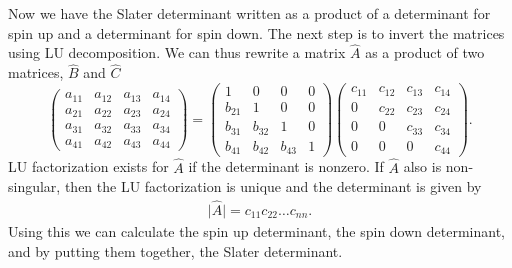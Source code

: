 		Now we have the Slater determinant written as a product of a determinant
		for spin up and a determinant for spin down. The next step is to invert
		the matrices using LU decomposition. We can thus rewrite a matrix
		$\hat{A}$ as a product of two matrices, $\hat{B}$ and $\hat{C}$
		\[
		\left(\begin{array}{cccc}
		a_{11} & a_{12} & a_{13} & a_{14}\\
		a_{21} & a_{22} & a_{23} & a_{24}\\
		a_{31} & a_{32} & a_{33} & a_{34}\\
		a_{41} & a_{42} & a_{43} & a_{44}
		\end{array}\right)=\left(\begin{array}{cccc}
		1 & 0 & 0 & 0\\
		b_{21} & 1 & 0 & 0\\
		b_{31} & b_{32} & 1 & 0\\
		b_{41} & b_{42} & b_{43} & 1
		\end{array}\right)\left(\begin{array}{cccc}
		c_{11} & c_{12} & c_{13} & c_{14}\\
		0 & c_{22} & c_{23} & c_{24}\\
		0 & 0 & c_{33} & c_{34}\\
		0 & 0 & 0 & c_{44}
		\end{array}\right).
		\]
		LU factorization exists for $\hat{A}$ if the determinant is nonzero.
		If $\hat{A}$ also is non-singular, then the LU factorization is unique
		and the determinant is given by
		\begin{align}
			\vert\hat{A}\vert=c_{11}c_{22}\dots c_{nn}.
		\end{align}
		Using this we can calculate the spin up determinant, the spin down
		determinant, and by putting them together, the Slater determinant.
